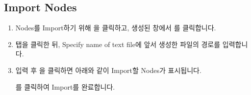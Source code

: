 \documentclass[a4paper,11pt,korean,openany,oneside]{sphinxmanual}
\begin{document}
\subsection{Import Nodes}
\label{\detokenize{3_import:import-nodes}}
\begin{sphinxShadowBox}
\begin{enumerate}
%
\item {} 
\sphinxAtStartPar
Nodes를 Import하기 위해 을 클릭하고, 생성된 창에서 를 클릭합니다.

\item {} 
\sphinxAtStartPar
{} 탭을 클릭한 뒤, Specify name of text file에 앞서 생성한  파일의 경로를 입력합니다.

\begin{center}
\noindent{}
\end{center}

\newpage

\item {} 
\sphinxAtStartPar
입력 후  \sphinxhyphen{} 을 클릭하면 아래와 같이 Import할 Nodes가 표시됩니다.

\begin{center}
\noindent{}
\end{center}

\sphinxAtStartPar
{}를 클릭하여 Import를 완료합니다.

\end{enumerate}
\end{sphinxShadowBox}
\end{document}
